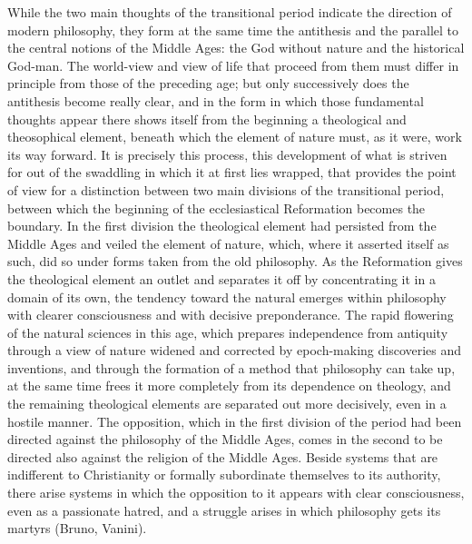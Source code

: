 While the two main thoughts of the transitional period indicate the
direction of modern philosophy, they form at the same time the
antithesis and the parallel to the central notions of the Middle Ages:
the God without nature and the historical God-man. The world-view and
view of life that proceed from them must differ in principle from
those of the preceding age; but only successively does the antithesis
become really clear, and in the form in which those fundamental
thoughts appear there shows itself from the beginning a theological
and theosophical element, beneath which the element of nature must, as
it were, work its way forward. It is precisely this process, this
development of what is striven for out of the swaddling in which it at
first lies wrapped, that provides the point of view for a distinction
between two main divisions of the transitional period, between which
the beginning of the ecclesiastical Reformation becomes the boundary.
In the first division the theological element had persisted from the
Middle Ages and veiled the element of nature, which, where it asserted
itself as such, did so under forms taken from the old philosophy. As
the Reformation gives the theological element an outlet and separates
it off by concentrating it in a domain of its own, the tendency toward
the natural emerges within philosophy with clearer consciousness and
with decisive preponderance. The rapid flowering of the natural
sciences in this age, which prepares independence from antiquity
through a view of nature widened and corrected by epoch-making
discoveries and inventions, and through the formation of a method that
philosophy can take up, at the same time frees it more completely from
its dependence on theology, and the remaining theological elements are
separated out more decisively, even in a hostile manner. The
opposition, which in the first division of the period had been
directed against the philosophy of the Middle Ages, comes in the
second to be directed also against the religion of the Middle Ages.
Beside systems that are indifferent to Christianity or formally
subordinate themselves to its authority, there arise systems
in which the opposition to it appears with clear consciousness, even as
a passionate hatred, and a struggle arises in which philosophy gets its
martyrs (Bruno, Vanini).

\divrule

